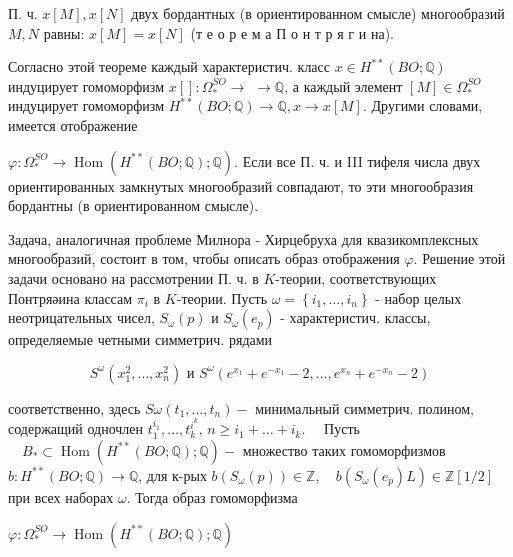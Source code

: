 \documentclass[10pt]{article}
\begin{document}
П. ч. $x[M], x[N]$ двух бордантных (в ориентированном смысле) многообразий $M, N$ равны: $x[M]=x[N]$ (т е о р е м а П о н т р я г и на).



Согласно этой теореме каждый характеристич. класс $x \in H^{* *}(B O ; \mathbb{Q})$ индуцирует гомоморфизм $x[]: \Omega_{*}^{S O} \rightarrow$ $\rightarrow \mathbb{Q}$, а каждый элемент $[M] \in \Omega_{*}^{S O}$ индуцирует гомоморфизм $H^{* *}(B O ; \mathbb{Q}) \rightarrow \mathbb{Q}, x \rightarrow x[M]$. Другими словами, имеется отображение



$\varphi: \Omega_{*}^{S O} \rightarrow \operatorname{Hom}\left(H^{* *}(B O ; \mathbb{Q}) ; \mathbb{Q}\right)$. Если все П. ч. и III тифеля числа двух ориентированных замкнутых многообразий совпадают, то эти многообразия бордантны (в ориентированном смысле).



Задача, аналогичная проблеме Милнора - Хирцебруха для квазикомплексных многообразий, состоит в том, чтобы описать образ отображения $\varphi$. Решение этой задачи основано на рассмотрении П. ч. в $K$-теории, соответствующих Понтряәина классам $\pi_{i}$ в $K$-теории. Пусть $\omega=\left\{i_{1}, \ldots, i_{n}\right\}$ - набор целых неотрицательных чисел, $S_{\omega}(p)$ и $S_{\omega}\left(e_{p}\right)$ - характеристич. классы, определяемые четными симметрич. рядами



\[

S^{\omega}\left(x_{1}^{2}, \ldots, x_{n}^{2}\right) \text { и } S^{\omega}\left(e^{x_{1}}+e^{-x_{1}}-2, \ldots, e^{x_{n}}+e^{-x_{n}}-2\right)

\]



соответственно, здесь $S \omega\left(t_{1}, \ldots, t_{n}\right)-$ минимальный симметрич. полином, содержащий одночлен $t_{1}^{i_{1}}, \ldots, t_{k}^{i^{k}}$, $n \geqslant i_{1}+\ldots+i_{k} . \quad$ Пусть $\quad B_{*} \subset \operatorname{Hom}\left(H^{* *}(B O ; \mathbb{Q}) ; \mathbb{Q}\right)-$ множество таких гомоморфизмов $b: H^{* *}(B O ; \mathbb{Q}) \rightarrow \mathbb{Q}$, для к-рых $b\left(S_{\omega}(p)\right) \in \mathbb{Z}, \quad b\left(S_{\omega}\left(e_{p}\right) L\right) \in \mathbb{Z}[1 / 2]$ при всех наборах $\omega$. Тогда образ гомоморфизма



$\varphi: \Omega_{*}^{S O} \longrightarrow \operatorname{Hom}\left(H^{* *}(B O ; \mathbb{Q}) ; \mathbb{Q}\right)$
\end{document}
